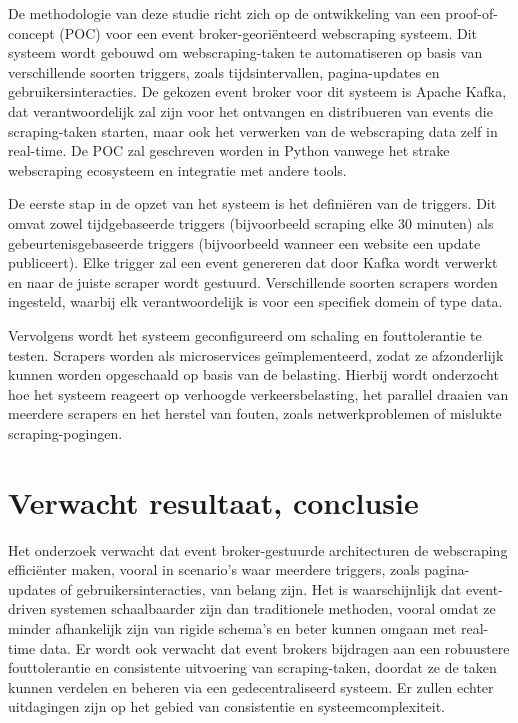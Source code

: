 De methodologie van deze studie richt zich op de ontwikkeling van een proof-of-concept (POC) voor een event broker-georiënteerd webscraping systeem. Dit systeem wordt gebouwd om webscraping-taken te automatiseren op basis van verschillende soorten triggers, zoals tijdsintervallen, pagina-updates en gebruikersinteracties. De gekozen event broker voor dit systeem is Apache Kafka, dat verantwoordelijk zal zijn voor het ontvangen en distribueren van events die scraping-taken starten, maar ook het verwerken van de webscraping data zelf in real-time. De POC zal geschreven worden in Python vanwege het strake webscraping ecosysteem en integratie met andere tools.

De eerste stap in de opzet van het systeem is het definiëren van de triggers. Dit omvat zowel tijdgebaseerde triggers (bijvoorbeeld scraping elke 30 minuten) als gebeurtenisgebaseerde triggers (bijvoorbeeld wanneer een website een update publiceert). Elke trigger zal een event genereren dat door Kafka wordt verwerkt en naar de juiste scraper wordt gestuurd. Verschillende soorten scrapers worden ingesteld, waarbij elk verantwoordelijk is voor een specifiek domein of type data.

Vervolgens wordt het systeem geconfigureerd om schaling en fouttolerantie te testen. Scrapers worden als microservices geïmplementeerd, zodat ze afzonderlijk kunnen worden opgeschaald op basis van de belasting. Hierbij wordt onderzocht hoe het systeem reageert op verhoogde verkeersbelasting, het parallel draaien van meerdere scrapers en het herstel van fouten, zoals netwerkproblemen of mislukte scraping-pogingen.


\section{Verwacht resultaat, conclusie}%
\label{sec:verwachte_resultaten}

Het onderzoek verwacht dat event broker-gestuurde architecturen de webscraping efficiënter maken, vooral in scenario's waar meerdere triggers, zoals pagina-updates of gebruikersinteracties, van belang zijn. Het is waarschijnlijk dat event-driven systemen schaalbaarder zijn dan traditionele methoden, vooral omdat ze minder afhankelijk zijn van rigide schema's en beter kunnen omgaan met real-time data. Er wordt ook verwacht dat event brokers bijdragen aan een robuustere fouttolerantie en consistente uitvoering van scraping-taken, doordat ze de taken kunnen verdelen en beheren via een gedecentraliseerd systeem. Er zullen echter uitdagingen zijn op het gebied van consistentie en systeemcomplexiteit.

